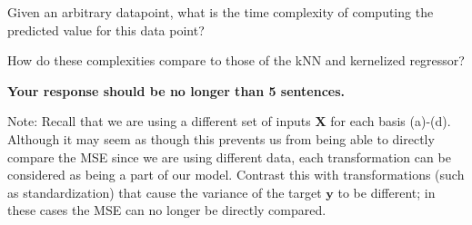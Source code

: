 \documentclass[submit]{harvardml}
\begin{document}
\begin{framed}
\begin{enumerate}
Given an arbitrary datapoint, what is the time complexity of computing the predicted value for this data point?

How do these complexities compare to those of the kNN and kernelized regressor?

\textbf{Your response should be no longer than 5 sentences.}

\end{enumerate}
Note:
Recall that we are using a 
different set of inputs $\mathbf{X}$ for each basis (a)-(d). 
Although it may seem as though this prevents us from being able 
to directly compare the MSE since we are using different data, 
each transformation can be considered as being a part of our model. 
Contrast this with transformations (such as standardization) that cause the variance
of the target $\mathbf{y}$ to be different; in these cases the
MSE can no longer be directly compared.

\end{framed}
\end{document}
